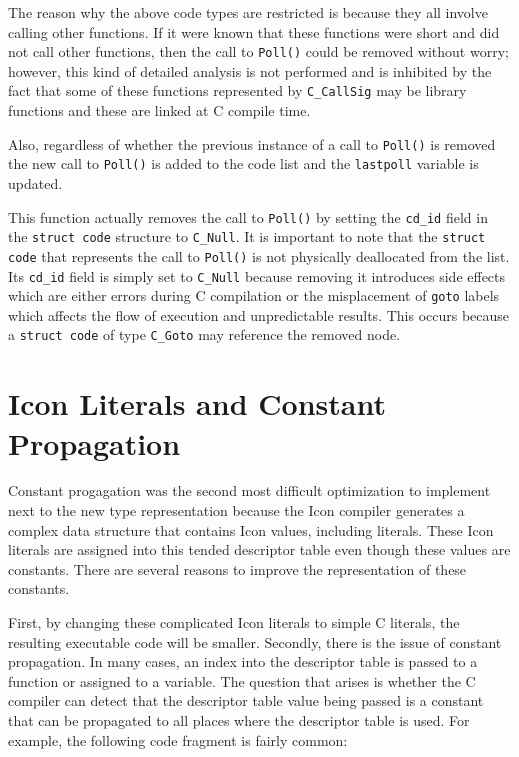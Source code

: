 The reason why the above code types are restricted is because they all
involve calling other functions. If it were known that these functions
were short and did not call other functions, then the call to
\texttt{Poll()} could be removed without worry; however, this kind of
detailed analysis is not performed and is inhibited by the fact that
some of these functions represented by \texttt{C\_CallSig} may be
library functions and these are linked at C compile time.

Also, regardless of whether the previous instance of a call to
\texttt{Poll()} is removed the new call to \texttt{Poll()} is added to
the code list and the \texttt{lastpoll} variable is updated.



This function actually removes the call to \texttt{Poll()} by setting
the \texttt{cd\_id} field in the \texttt{struct code} structure to
\texttt{C\_Null}. It is important to note that the \texttt{struct
code} that represents the call to \texttt{Poll()} is not physically
deallocated from the list. Its \texttt{cd\_id} field is simply set
to \texttt{C\_Null} because removing it introduces side effects which
are either errors during C compilation or the misplacement of
\texttt{goto} labels which affects the flow of execution and
unpredictable results. This occurs because a \texttt{struct code}
of type \texttt{C\_Goto} may reference the removed node.

\section{Icon Literals and Constant Propagation}

Constant progagation was the second most difficult optimization to
implement next to the new type representation because the Icon
compiler generates a complex data structure that contains Icon values,
including literals. These Icon literals are assigned into this tended
descriptor table even though these values are constants. There are
several reasons to improve the representation of these constants.

First, by changing these complicated Icon literals to simple C
literals, the resulting executable code will be smaller. Secondly,
there is the issue of constant propagation. In many cases, an index
into the descriptor table is passed to a function or assigned to a
variable. The question that arises is whether the C compiler can
detect that the descriptor table value being passed is a constant that
can be propagated to all places where the descriptor table is used.
For example, the following code fragment is fairly common:

